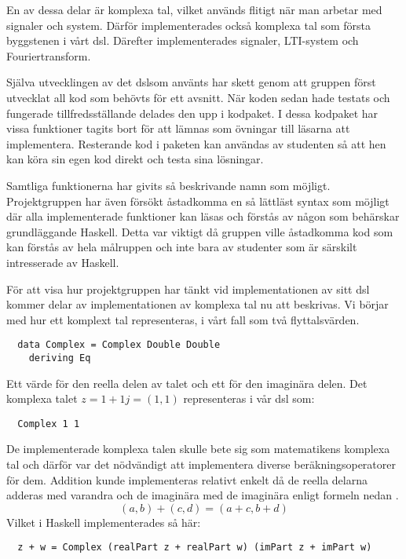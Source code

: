 \documentclass[12pt,a4paper,twoside,openright]{article}
\begin{document}
En av dessa delar är komplexa tal, vilket används flitigt när man
arbetar med signaler och system. Därför implementerades också komplexa
tal som första byggstenen i vårt \gls{dsl}. Därefter implementerades
signaler, LTI-system och Fouriertransform.

Själva utvecklingen av det \gls{dsl}som använts har skett genom att
gruppen först utvecklat all kod som behövts för ett avsnitt. När koden
sedan hade testats och fungerade tillfredsställande delades den upp i
kodpaket. I dessa kodpaket har vissa funktioner tagits bort för att
lämnas som övningar till läsarna att implementera. Resterande kod i
paketen kan användas av studenten så att hen kan köra sin egen kod
direkt och testa sina lösningar.

Samtliga funktionerna har givits så beskrivande namn som
möjligt. Projektgruppen har även försökt åstadkomma en så lättläst
syntax som möjligt där alla implementerade funktioner kan läsas och
förstås av någon som behärskar grundläggande Haskell. Detta var
viktigt då gruppen ville åstadkomma kod som kan förstås av hela
målruppen och inte bara av studenter som är särskilt intresserade av
Haskell.

För att visa hur projektgruppen har tänkt vid implementationen av sitt
\gls{dsl} kommer delar av implementationen av komplexa tal nu att
beskrivas. Vi börjar med hur ett komplext tal representeras, i vårt
fall som två flyttalsvärden.
\begin{verbatim}
  data Complex = Complex Double Double
    deriving Eq
\end{verbatim}
Ett värde för den reella delen av talet och ett för den imaginära
delen. Det komplexa talet \(z = 1 + 1j = (1,1) \) representeras i vår
\gls{dsl} som:
\begin{verbatim}
  Complex 1 1
\end{verbatim}
De implementerade komplexa talen skulle bete sig som matematikens
komplexa tal och därför var det nödvändigt att implementera diverse
beräkningsoperatorer för dem. Addition kunde implementeras relativt
enkelt då de reella delarna adderas med varandra och de imaginära med
de imaginära enligt formeln nedan \cite{conway1978functions}.
\[(a, b) + (c, d) = (a + c, b + d)\]
Vilket i Haskell implementerades så här:
\begin{verbatim}
  z + w = Complex (realPart z + realPart w) (imPart z + imPart w)
\end{verbatim}
\end{document}
